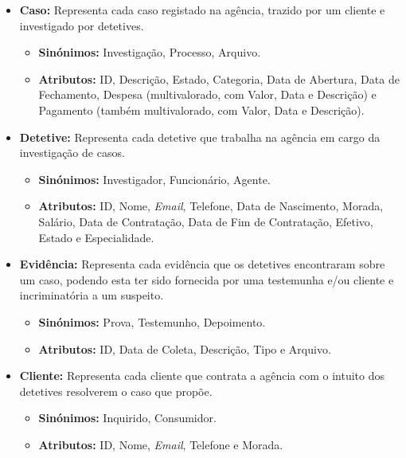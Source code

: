 \documentclass[a4paper,12pt]{scrreprt}
\begin{document}
        \begin{itemize}
        \item \textbf{Caso:} Representa cada caso registado na agência, trazido por um cliente e investigado por detetives.
            \begin{itemize}
            \item\textbf{Sinónimos:} Investigação, Processo, Arquivo. 
            \item\textbf{Atributos:} ID, Descrição, Estado, Categoria, Data de Abertura, Data de Fechamento, Despesa (multivalorado, com Valor, Data e Descrição) e Pagamento (também multivalorado, com Valor, Data e Descrição).
            \end{itemize}

        \item \textbf{Detetive:} Representa cada detetive que trabalha na agência em cargo da investigação de casos.
            \begin{itemize}
            \item\textbf{Sinónimos:} Investigador, Funcionário, Agente.
            \item\textbf{Atributos:} ID, Nome, \textit{Email}, Telefone, Data de Nascimento, Morada, Salário, Data de Contratação, Data de Fim de Contratação, Efetivo, Estado e Especialidade.
            \end{itemize}

        \item \textbf{Evidência:} Representa cada evidência que os detetives encontraram sobre um caso, podendo esta ter sido fornecida por uma testemunha e/ou cliente e incriminatória a um suspeito.
            \begin{itemize}
            \item\textbf{Sinónimos:} Prova, Testemunho, Depoimento. 
            \item\textbf{Atributos:} ID, Data de Coleta, Descrição, Tipo e Arquivo.
            \end{itemize}

        \item \textbf{Cliente:} Representa cada cliente que contrata a agência com o intuito dos detetives resolverem o caso que propõe.
            \begin{itemize}
            \item\textbf{Sinónimos:} Inquirido, Consumidor.
            \item\textbf{Atributos:} ID, Nome, \textit{Email}, Telefone e Morada. 
            \end{itemize}


\end{itemize}
\end{document}

